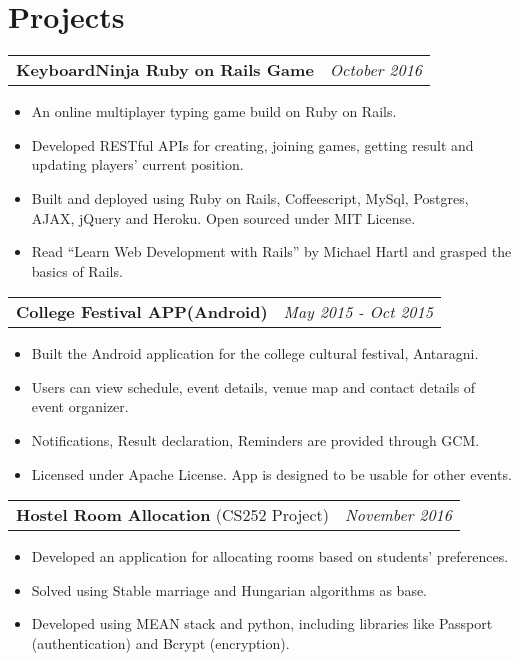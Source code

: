 \documentclass{article}
\begin{document}
\section{Projects}
\begin{tabularx}{\textwidth}{Xl}
	      \textbf{KeyboardNinja Ruby on Rails Game}
	      & \textit{October 2016}
	      \end{tabularx}
	      \begin{itemize}
		\vspace{-2mm} \setlength\itemsep{-0.2em}
		\item An online multiplayer typing game build on Ruby on Rails.
		\item Developed RESTful APIs for creating, joining games, getting result and updating players' current position.
		\item Built and deployed using Ruby on Rails, Coffeescript, MySql, Postgres, AJAX, jQuery and Heroku. Open sourced under MIT License.
		\item Read ``Learn Web Development with Rails'' by Michael Hartl and grasped the basics of Rails.
	      \end{itemize}
\begin{tabularx}{\textwidth}{Xl}
	      \textbf{College Festival APP(Android)}
	     & \textit{May 2015 - Oct 2015}
	      \end{tabularx}
	      \begin{itemize}
	      	\vspace{-2mm} \setlength\itemsep{-0.2em}
	      	\item Built the Android application for the college cultural festival, Antaragni.
	      	\item Users can view schedule, event details, venue map and contact details of event organizer.
	      	\item Notifications, Result declaration, Reminders are provided through GCM.
	      	\item Licensed under Apache License. App is designed to be usable for other events.
	      \end{itemize}
\begin{tabularx}{\textwidth}{Xl}
	 \textbf{Hostel Room Allocation} (CS252 Project)
	 & \textit{November 2016}
	 \end{tabularx}
\begin{itemize}
\item Developed an application for allocating rooms based on students' preferences.
\item Solved using Stable marriage and Hungarian algorithms as base.
\item Developed using MEAN stack and python, including libraries like Passport (authentication) and Bcrypt (encryption).
\end{itemize}
\end{document}
